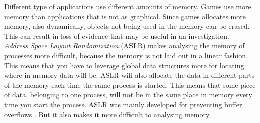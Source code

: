 Different type of applications use different amounts of memory. Games use more 
memory than applications that is not as graphical. Since games allocates more 
memory, also dynamically, objects not being used in the memory can be erased. 
This can result in loss of evidence that may be useful in an investigation.\\

\textit{Address Space Layout Randomization} (ASLR) makes analysing the memory 
of processes more difficult, because the memory is not laid out in a linear 
fashion. This means that you have to leverage global data structures more for
locating where in memory data will be. ASLR will also allocate the data in 
different parts of the memory each time the same process is started. This means
that some piece of data, belonging to one process,  will not be in the same 
place in memory every time you start the process. ASLR was mainly developed for 
preventing buffer overflows \cite{prot_aslr}. But it also makes it more difficult
to analysing memory.\\





%
%

